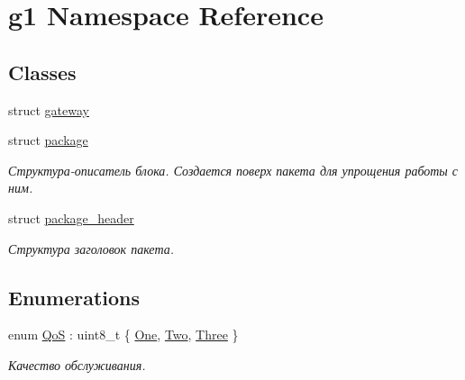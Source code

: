 \hypertarget{namespaceg1}{}\section{g1 Namespace Reference}
\label{namespaceg1}
\subsection*{Classes}
\begin{DoxyCompactItemize}
\item 
struct \hyperlink{structg1_1_1gateway}{gateway}
\item 
struct \hyperlink{structg1_1_1package}{package}
\begin{DoxyCompactList}\small\item\em Структура-\/описатель блока. Создается поверх пакета для упрощения работы с ним. \end{DoxyCompactList}\item 
struct \hyperlink{structg1_1_1package__header}{package\+\_\+header}
\begin{DoxyCompactList}\small\item\em Структура заголовок пакета. \end{DoxyCompactList}\end{DoxyCompactItemize}
\subsection*{Enumerations}
\begin{DoxyCompactItemize}
\item 
enum \hyperlink{namespaceg1_a157fb77f1b8142697dc1b88efaae6a0a}{QoS} \+: uint8\+\_\+t \{ \hyperlink{namespaceg1_a157fb77f1b8142697dc1b88efaae6a0aa3a08e2a74d22aa3fcb0ba7207d30814e}{One}, 
\hyperlink{namespaceg1_a157fb77f1b8142697dc1b88efaae6a0aada9a952d5dc002634dc185c74cd9b460}{Two}, 
\hyperlink{namespaceg1_a157fb77f1b8142697dc1b88efaae6a0aa7cb9b75182ee893ea264e4a3097068e7}{Three}
 \}\begin{DoxyCompactList}\small\item\em Качество обслуживания. \end{DoxyCompactList}
\end{DoxyCompactItemize}
